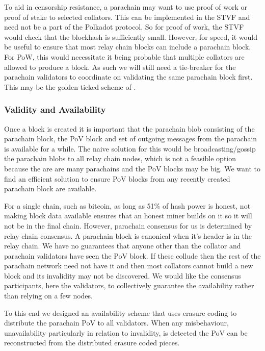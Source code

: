 To aid in censorship resistance, a parachain may want to use proof of work or proof of stake to selected collators.
This can be implemented in the STVF and need not be a part of the Polkadot protocol. So for proof of work,
the STVF would check that the blockhash is sufficiently small.
However, for speed, it would be useful to ensure that most relay chain blocks can include a parachain block.
For PoW, this would necessitate it being probable that multiple collators are allowed to produce a block.
As such we will still need a tie-breaker for the parachain validators to coordinate on validating the same parachain block first.
This may be the golden ticked scheme of \cite{2016:Wood:Polkadot}.


\subsubsection{Validity and Availability} \label{sec:validity-and-availability}
Once a block is created it is important that the parachain blob consisting of the parachain block, the PoV block and set of outgoing messages from the parachain is available for a while.
The naive solution for this would be broadcasting/gossip the parachain blobs to all relay chain nodes, which is not a feasible option because the are are many parachains and the PoV blocks may be big.
We want to find an efficient solution to ensure PoV blocks from any recently created parachain block are available.

For a single chain, such as bitcoin, as long as 51\% of hash power is honest, not making block data available ensures that an honest miner builds on it so it will not be in the final chain. However, parachain consensus for us is determined by relay chain consensus.
A parachain block is canonical when it's header is in the relay chain.
We have no guarantees that anyone other than the collator and parachain validators have seen the PoV block.
If these collude then the rest of the parachain network need not have it and then most collators cannot build a new block and its invalidity may not be discovered.
We would like the consensus participants, here the validators, to collectively guarantee the availability rather than relying on a few nodes.

To this end we designed an availability scheme that uses erasure coding \cite{} to distribute the parachain PoV to all validators.
When any misbehaviour, unavailability particularly in relation to invalidity, is detected the PoV can be reconstructed from the distributed erasure coded pieces.

